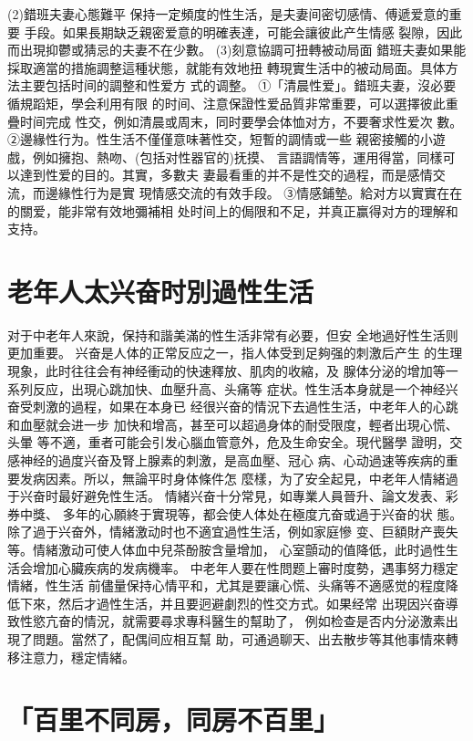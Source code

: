 \documentclass[12pt,UTF8]{ctexbook}
\begin{document}
(2)錯班夫妻心態難平
保持一定頻度的性生活，是夫妻间密切感情、傅遞爱意的重要
手段。如果長期缺乏親密爱意的明確表達，可能会讓彼此产生情感
裂隙，因此而出現抑鬱或猜忌的夫妻不在少數。
(3)刻意協調可扭轉被动局面
錯班夫妻如果能採取適當的措施調整這種状態，就能有效地扭
轉現實生活中的被动局面。具体方法主要包括时间的調整和性爱方
式的调整。
①「清晨性爱」。錯班夫妻，沒必要循規蹈矩，學会利用有限
的时间、注意保證性爱品質非常重要，可以選擇彼此重疊时间完成
性交，例如清晨或周末，同时要學会体恤对方，不要奢求性爱次
數。
②邊緣性行为。性生活不僅僅意味著性交，短暫的調情或一些
親密接觸的小遊戲，例如擁抱、熱吻、(包括对性器官的)抚摸、
言語調情等，運用得當，同樣可以達到性爱的目的。其實，多數夫
妻最看重的并不是性交的過程，而是感情交流，而邊緣性行为是實
現情感交流的有效手段。
③情感鋪墊。給对方以實實在在的關爱，能非常有效地彌補相
处时间上的侷限和不足，并真正赢得对方的理解和支持。


\section{老年人太兴奋时別過性生活}

对于中老年人來說，保持和諧美滿的性生活非常有必要，但安
全地過好性生活则更加重要。
兴奋是人体的正常反应之一，指人体受到足夠强的刺激后产生
的生理現象，此时往往会有神经衝动的快速釋放、肌肉的收縮，及
腺体分泌的增加等一系列反应，出現心跳加快、血壓升高、头痛等
症状。性生活本身就是一个神经兴奋受刺激的過程，如果在本身已
经很兴奋的情況下去過性生活，中老年人的心跳和血壓就会进一步
加快和增高，甚至可以超過身体的耐受限度，輕者出現心慌、头暈
等不適，重者可能会引发心腦血管意外，危及生命安全。現代醫學
證明，交感神经的過度兴奋及腎上腺素的刺激，是高血壓、冠心
病、心动過速等疾病的重要发病因素。所以，無論平时身体條件怎
麼樣，为了安全起見，中老年人情緒過于兴奋时最好避免性生活。
情緒兴奋十分常見，如專業人員晉升、論文发表、彩券中獎、
多年的心願終于實現等，都会使人体处在極度亢奋或過于兴奋的状
態。除了過于兴奋外，情緒激动时也不適宜過性生活，例如家庭慘
变、巨額財产喪失等。情緒激动可使人体血中兒茶酚胺含量增加，
心室顫动的值降低，此时過性生活会增加心臟疾病的发病機率。
中老年人要在性問题上審时度勢，遇事努力穩定情緒，性生活
前儘量保持心情平和，尤其是要讓心慌、头痛等不適感觉的程度降
低下來，然后才過性生活，并且要迥避劇烈的性交方式。如果经常
出現因兴奋導致性慾亢奋的情況，就需要尋求專科醫生的幫助了，
例如检查是否内分泌激素出現了問題。當然了，配偶间应相互幫
助，可通過聊天、出去散步等其他事情來轉移注意力，穩定情緒。

\section{「百里不同房，同房不百里」}
\end{document}
